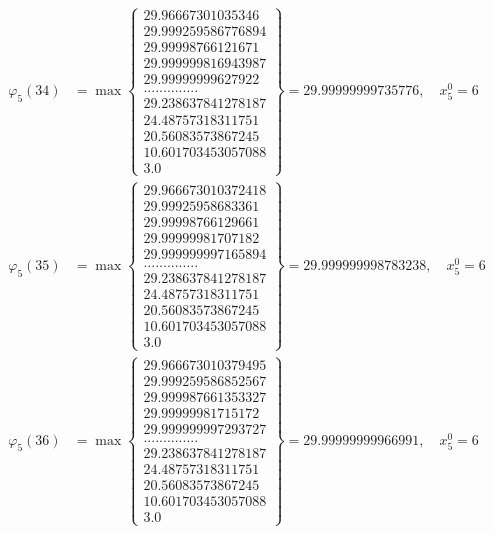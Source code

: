 \documentclass{article}
\begin{document}
\begin{align*}
  
  
  
\varphi_{5}(34) &= \max \left\{ \begin{array}{c}
29.96667301035346 \\
 29.999259586776894 \\
 29.99998766121671 \\
 29.999999816943987 \\
 29.99999999627922 \\
 .............. \\
 29.238637841278187 \\
 24.48757318311751 \\
 20.56083573867245 \\
 10.601703453057088 \\
 3.0
\end{array} \right\} = 29.99999999735776, \quad x_{5}^0 = 6\\
  
  
  
  
\varphi_{5}(35) &= \max \left\{ \begin{array}{c}
29.966673010372418 \\
 29.99925958683361 \\
 29.99998766129661 \\
 29.99999981707182 \\
 29.999999997165894 \\
 .............. \\
 29.238637841278187 \\
 24.48757318311751 \\
 20.56083573867245 \\
 10.601703453057088 \\
 3.0
\end{array} \right\} = 29.999999998783238, \quad x_{5}^0 = 6\\
  
  
  
  
\varphi_{5}(36) &= \max \left\{ \begin{array}{c}
29.966673010379495 \\
 29.999259586852567 \\
 29.999987661353327 \\
 29.99999981715172 \\
 29.999999997293727 \\
 .............. \\
 29.238637841278187 \\
 24.48757318311751 \\
 20.56083573867245 \\
 10.601703453057088 \\
 3.0
\end{array} \right\} = 29.99999999966991, \quad x_{5}^0 = 6\\
  
  
\end{align*}
\end{document}
